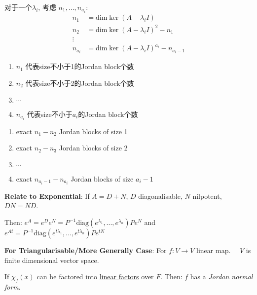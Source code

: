 \documentclass[9pt]{article}
\begin{document}
\vspace{-10pt}
\begin{multicols}{3}
    \vspace{-20pt}
    {\footnotesize 对于一个$\lambda_i$, 考虑 $n_1,...,n_{a_i}$:}
    \[
    \begin{aligned}
        n_1 & = \text{dim}\ker(A-\lambda_iI) \\
        n_2 & = \text{dim}\ker(A-\lambda_iI)^2 - n_1 \\
        \vdots & \\
        n_{a_i} & = \text{dim}\ker(A-\lambda_iI)^{a_i} - n_{a_i-1}
    \end{aligned}
    \]

\columnbreak
    \begin{enumerate}[itemsep=-2pt, topsep=-2pt]
        \footnotesize
        \item $n_1$ 代表size不小于1的Jordan block个数
        \item $n_2$ 代表size不小于2的Jordan block个数
        \item $\cdots$
        \item $n_{a_i}$ 代表size不小于$a_i$的Jordan block个数
    \end{enumerate}

\columnbreak

    \begin{enumerate}[itemsep=-2pt, topsep=-2pt]
        \footnotesize
        \item exact $n_1-n_2$ Jordan blocks of size 1
        \item exact $n_2-n_3$ Jordan blocks of size 2
        \item $\cdots$
        \item exact $n_{a_i-1}-n_{a_i}$ Jordan blocks of size $a_i-1$
    \end{enumerate}

\end{multicols}

\textbf{Relate to Exponential}: If $A=D+N$, $D$ diagonalisable, $N$ nilpotent, $DN=ND$. 

\hspace{100pt} Then: $e^A=e^De^N=P^{-1}\text{diag}(e^{\lambda_1},...,e^{\lambda_n})Pe^{N}$ and $e^{At}=P^{-1}\text{diag}(e^{t\lambda_1},...,e^{t\lambda_n})Pe^{tN}$

\textbf{For Triangularisable/More Generally Case}: For $f:V\to V$ linear map. \ \ $V$ is finite dimensional vector space. 

\quad If $\chi_f(x)$ can be factored into \underline{linear factors} over $F$. \quad Then: $f$ has a \textit{Jordan normal form}.
\end{document}
